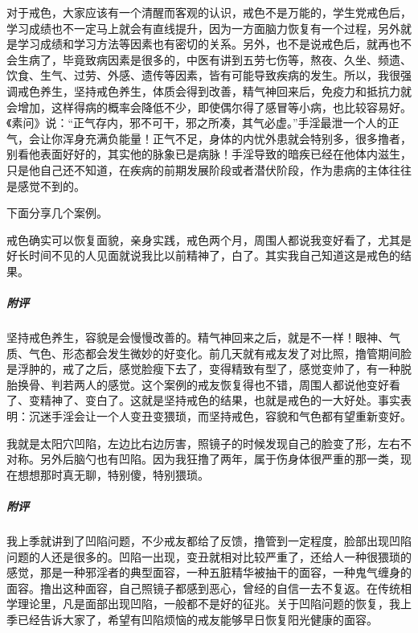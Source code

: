 对于戒色，大家应该有一个清醒而客观的认识，戒色不是万能的，学生党戒色后，学习成绩也不一定马上就会有直线提升，因为一方面脑力恢复有一个过程，另外就是学习成绩和学习方法等因素也有密切的关系。另外，也不是说戒色后，就再也不会生病了，毕竟致病因素是很多的，中医有讲到五劳七伤等，熬夜、久坐、频遗、饮食、生气、过劳、外感、遗传等因素，皆有可能导致疾病的发生。所以，我很强调戒色养生，坚持戒色养生，体质会得到改善，精气神回来后，免疫力和抵抗力就会增加，这样得病的概率会降低不少，即使偶尔得了感冒等小病，也比较容易好。《素问》说：“正气存内，邪不可干，邪之所凑，其气必虚。”手淫最泄一个人的正气，会让你浑身充满负能量！正气不足，身体的内忧外患就会特别多，很多撸者，别看他表面好好的，其实他的脉象已是病脉！手淫导致的暗疾已经在他体内滋生，只是他自己还不知道，在疾病的前期发展阶段或者潜伏阶段，作为患病的主体往往是感觉不到的。

下面分享几个案例。

\begin{case}
    戒色确实可以恢复面貌，亲身实践，戒色两个月，周围人都说我变好看了，尤其是好长时间不见的人见面就说我比以前精神了，白了。其实我自己知道这是戒色的结果。
    \subparagraph{附评} 坚持戒色养生，容貌是会慢慢改善的。精气神回来之后，就是不一样！眼神、气质、气色、形态都会发生微妙的好变化。前几天就有戒友发了对比照，撸管期间脸是浮肿的，戒了之后，感觉脸瘦下去了，变得精致有型了，感觉变帅了，有一种脱胎换骨、判若两人的感觉。这个案例的戒友恢复得也不错，周围人都说他变好看了、变精神了、变白了。这就是坚持戒色的结果，也就是戒色的一大好处。事实表明：沉迷手淫会让一个人变丑变猥琐，而坚持戒色，容貌和气色都有望重新变好。
\end{case}

\begin{case}
    我就是太阳穴凹陷，左边比右边厉害，照镜子的时候发现自己的脸变了形，左右不对称。另外后脑勺也有凹陷。因为我狂撸了两年，属于伤身体很严重的那一类，现在想想那时真无聊，特别傻，特别猥琐。
    \subparagraph{附评} 我上季就讲到了凹陷问题，不少戒友都给了反馈，撸管到一定程度，脸部出现凹陷问题的人还是很多的。凹陷一出现，变丑就相对比较严重了，还给人一种很猥琐的感觉，那是一种邪淫者的典型面容，一种五脏精华被抽干的面容，一种鬼气缠身的面容。撸出这种面容，自己照镜子都感到恶心，曾经的自信一去不复返。在传统相学理论里，凡是面部出现凹陷，一般都不是好的征兆。关于凹陷问题的恢复，我上季已经告诉大家了，希望有凹陷烦恼的戒友能够早日恢复阳光健康的面容。
\end{case}

